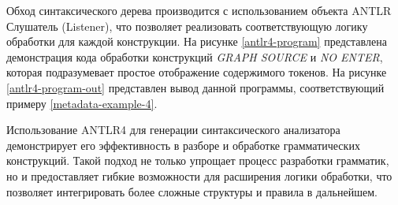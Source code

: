 Обход синтаксического дерева производится с использованием объекта ANTLR Слушатель (Listener), что позволяет реализовать соответствующую логику обработки для каждой конструкции. На рисунке \ref{antlr4-program} представлена демонстрация кода обработки конструкций \textit{GRAPH SOURCE} и \textit{NO ENTER}, которая подразумевает простое отображение содержимого токенов. На рисунке \ref{antlr4-program-out} представлен вывод данной программы, соответствующий примеру \ref{metadata-example-4}.

Использование ANTLR4 для генерации синтаксического анализатора демонстрирует его эффективность в разборе и обработке грамматических конструкций. Такой подход не только упрощает процесс разработки грамматик, но и предоставляет гибкие возможности для расширения логики обработки, что позволяет интегрировать более сложные структуры и правила в дальнейшем.
